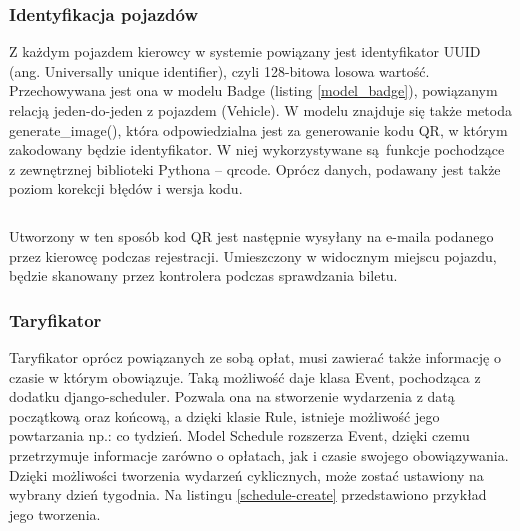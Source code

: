 \subsubsection*{Identyfikacja pojazdów}

Z każdym pojazdem kierowcy w systemie powiązany jest identyfikator UUID (ang. Universally unique identifier), czyli 128-bitowa losowa wartość. Przechowywana jest ona w modelu Badge (listing \ref{model_badge}), powiązanym relacją jeden-do-jeden z pojazdem (Vehicle). W modelu znajduje się także metoda generate\_image(), która odpowiedzialna jest za generowanie kodu QR, w którym zakodowany będzie identyfikator. W niej wykorzystywane są funkcje pochodzące z zewnętrznej biblioteki Pythona -- qrcode. Oprócz danych, podawany jest także poziom korekcji błędów i wersja kodu.

\begin{singlespace}
	\label{model_badge}
	\vspace{0.3cm}
	\inputminted[fontsize=\footnotesize]{python}{src/imp/badges-badge.py}
\end{singlespace}

\vspace{0.3cm}

Utworzony w ten sposób kod QR jest następnie wysyłany na e-maila podanego przez kierowcę podczas rejestracji. Umieszczony w widocznym miejscu pojazdu, będzie skanowany przez kontrolera podczas sprawdzania biletu.

\subsubsection*{Taryfikator}

Taryfikator oprócz powiązanych ze sobą opłat, musi zawierać także informację o czasie w którym obowiązuje. Taką możliwość daje klasa Event, pochodząca z dodatku django-scheduler. Pozwala ona na stworzenie wydarzenia z datą początkową oraz końcową, a dzięki klasie Rule, istnieje możliwość jego powtarzania np.: co tydzień. Model Schedule rozszerza Event, dzięki czemu  przetrzymuje informacje zarówno o opłatach, jak i czasie swojego obowiązywania. Dzięki możliwości tworzenia wydarzeń cyklicznych, może zostać ustawiony na wybrany dzień tygodnia. Na listingu \ref{schedule-create} przedstawiono przykład jego tworzenia.

\begin{singlespace}
	\label{schedule-create}
	\vspace{0.3cm}
	\inputminted[fontsize=\footnotesize]{python}{src/imp/schedule-create.py}
\end{singlespace}


